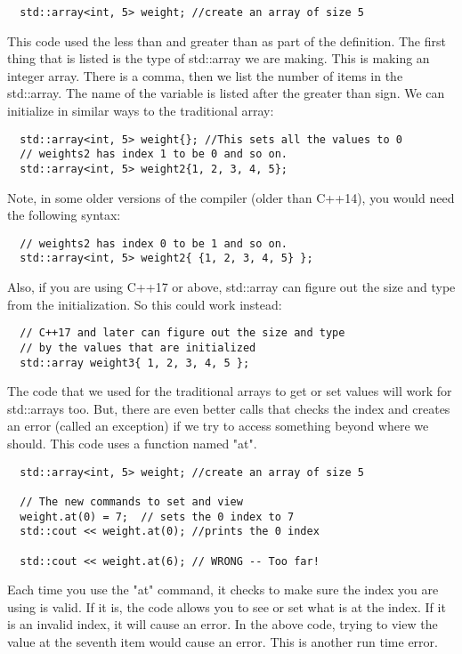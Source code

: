 \begin{lstlisting}
  std::array<int, 5> weight; //create an array of size 5
\end{lstlisting}
This code used the less than and greater than as part of
the definition. The first thing that is listed is the type 
of std::array we are making. This is making an integer array.
There is a comma, then we list the number of items in the 
std::array. The name of the variable is listed after the greater than sign. We can initialize in similar ways to
the traditional array:
\begin{lstlisting}
  std::array<int, 5> weight{}; //This sets all the values to 0
  // weights2 has index 1 to be 0 and so on.
  std::array<int, 5> weight2{1, 2, 3, 4, 5}; 
\end{lstlisting}
Note, in some older versions of the compiler (older than C++14), you would need the following syntax:
\begin{lstlisting}
  // weights2 has index 0 to be 1 and so on.
  std::array<int, 5> weight2{ {1, 2, 3, 4, 5} }; 
\end{lstlisting}

Also, if you are using C++17 or above, std::array can
figure out the size and type from the initialization. So
this could work instead:
\begin{lstlisting}
  // C++17 and later can figure out the size and type
  // by the values that are initialized
  std::array weight3{ 1, 2, 3, 4, 5 }; 
\end{lstlisting}

The code that we used for the traditional arrays to get
or set values will work for std::arrays too. But, there
are even better calls that checks the index and creates
an error (called an exception) if we try to access something
beyond where we should. This code uses a function named "at".
\begin{lstlisting}
  std::array<int, 5> weight; //create an array of size 5

  // The new commands to set and view
  weight.at(0) = 7;  // sets the 0 index to 7
  std::cout << weight.at(0); //prints the 0 index
  
  std::cout << weight.at(6); // WRONG -- Too far! 
\end{lstlisting}
Each time you use the "at" command, it checks to make sure the index you are using is valid. If it is, the code allows you to see or set what is at the index. If it is an invalid index, it will cause an error. In the above code, trying to view the value at the seventh item would cause an
error. This is another run time error. 

